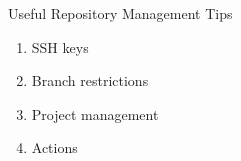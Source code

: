 \documentclass[aspectratio=169]{beamer}
\begin{document}
\begin{frame}{Useful Repository Management Tips}

\begin{enumerate}
\item
  SSH keys
\item
  Branch restrictions
\item
  Project management
\item
  Actions
\end{enumerate}

\end{frame}
\end{document}
